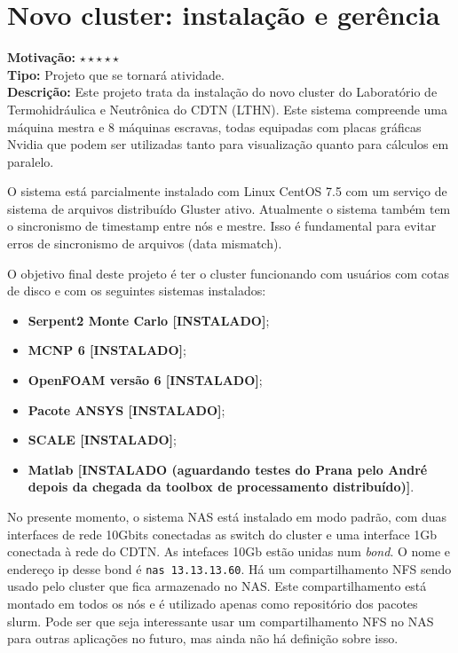 \chapter{Novo cluster: instalação e gerência}

\textbf{Motivação:} $\star\star\star\star\star$\\

\textbf{Tipo:} Projeto que se tornará atividade.\\

\textbf{Descrição:} Este projeto trata da instalação do novo cluster do Laboratório 
de Termohidráulica e Neutrônica do CDTN (LTHN). Este sistema compreende uma máquina mestra e 8 máquinas escravas, todas equipadas com placas gráficas Nvidia que podem ser utilizadas tanto para visualização quanto para cálculos em paralelo.

O sistema está parcialmente instalado com Linux CentOS 7.5 com um serviço de 
sistema de arquivos distribuído Gluster ativo. Atualmente o sistema também tem 
o sincronismo de timestamp entre nós e mestre. Isso é fundamental para evitar 
erros de sincronismo de arquivos (data mismatch).

O objetivo final deste projeto é ter o cluster funcionando com usuários com cotas 
de disco e com os seguintes sistemas instalados:

\begin{itemize}
	\item \textbf{Serpent2 Monte Carlo [INSTALADO]};
	\item \textbf{MCNP 6 [INSTALADO]};
	\item \textbf{OpenFOAM versão 6 [INSTALADO]};
	\item \textbf{Pacote ANSYS [INSTALADO]};
	\item \textbf{SCALE [INSTALADO]};
	\item \textbf{Matlab [INSTALADO (aguardando testes do Prana pelo André depois 
	da chegada da toolbox de processamento distribuído)]}.
\end{itemize}

No presente momento, o sistema NAS está instalado em modo padrão, com duas 
interfaces de rede 10Gbits conectadas as switch do cluster e uma interface 
1Gb conectada à rede do CDTN. As intefaces 10Gb estão unidas num \textit{bond}. 
O nome e endereço ip desse bond é \texttt{nas 13.13.13.60}. Há um compartilhamento 
NFS sendo usado pelo cluster que fica armazenado no NAS. Este compartilhamento 
está montado em todos os nós e é utilizado apenas como repositório dos pacotes 
slurm. Pode ser que seja interessante usar um compartilhamento NFS no NAS para 
outras aplicações no futuro, mas ainda não há definição sobre isso.


